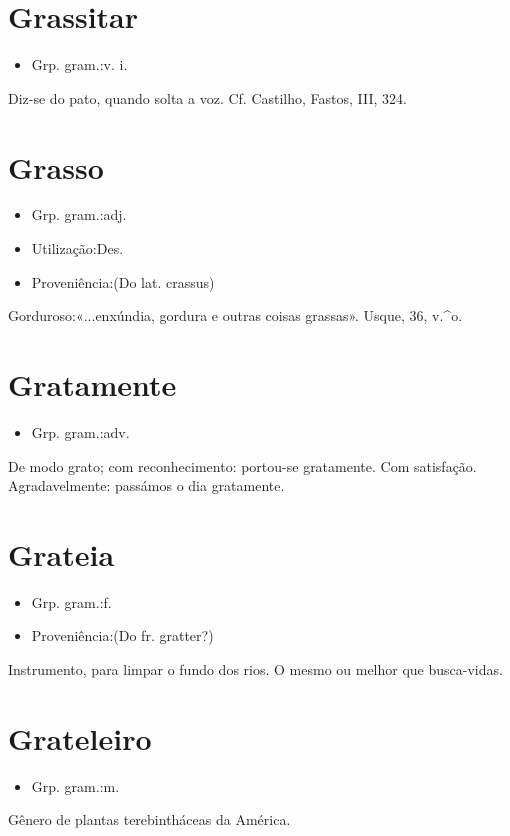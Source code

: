 \section{Grassitar}
\begin{itemize}
\item {Grp. gram.:v. i.}
\end{itemize}
Diz-se do pato, quando solta a voz. Cf. Castilho, \textunderscore Fastos\textunderscore , III, 324.
\section{Grasso}
\begin{itemize}
\item {Grp. gram.:adj.}
\end{itemize}
\begin{itemize}
\item {Utilização:Des.}
\end{itemize}
\begin{itemize}
\item {Proveniência:(Do lat. \textunderscore crassus\textunderscore )}
\end{itemize}
Gorduroso:«\textunderscore ...enxúndia, gordura e outras coisas grassas\textunderscore ». \textunderscore Usque\textunderscore , 36, v.^o.
\section{Gratamente}
\begin{itemize}
\item {Grp. gram.:adv.}
\end{itemize}
De modo grato; com reconhecimento: \textunderscore portou-se gratamente\textunderscore .
Com satisfação.
Agradavelmente: \textunderscore passámos o dia gratamente\textunderscore .
\section{Grateia}
\begin{itemize}
\item {Grp. gram.:f.}
\end{itemize}
\begin{itemize}
\item {Proveniência:(Do fr. \textunderscore gratter\textunderscore ?)}
\end{itemize}
Instrumento, para limpar o fundo dos rios.
O mesmo ou melhor que \textunderscore busca-vidas\textunderscore .
\section{Grateleiro}
\begin{itemize}
\item {Grp. gram.:m.}
\end{itemize}
Gênero de plantas terebintháceas da América.
